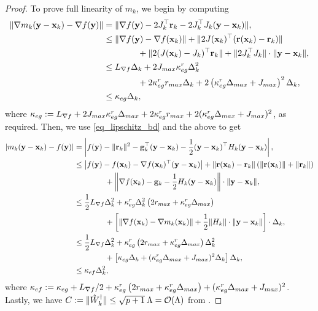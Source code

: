\begin{proof}
To prove full linearity of $m_k$, we begin by computing
\begin{align}
	\|\nabla m_k(\mathbf{y}-\mathbf{x}_k) - \nabla f(\mathbf{y})\| &= \|\nabla f(\mathbf{y}) - 2 J_k^{\top}\mathbf{r}_k - 2 J_k^{\top}J_k(\mathbf{y}-\mathbf{x}_k)\|, \\
	&\leq \|\nabla f(\mathbf{y}) - \nabla f(\mathbf{x}_k)\| + \|2J(\mathbf{x}_k)^{\top}(\mathbf{r}(\mathbf{x}_k)-\mathbf{r}_k)\| \nonumber \\ 
	&\qquad\qquad + \|2(J(\mathbf{x}_k)-J_k)^{\top}\mathbf{r}_k\| + \|2 J_k^{\top}J_k\|\cdot\|\mathbf{y}-\mathbf{x}_k\|, \\
	&\leq L_{\nabla f} \Delta_k + 2J_{max}\kappa_{eg}^r\Delta_k^2 \nonumber \\
	&\qquad\qquad + 2\kappa_{eg}^r r_{max}\Delta_k + 2\left(\kappa_{eg}^r\Delta_{max}+J_{max}\right)^2\Delta_k, \\
	&\leq \kappa_{eg}\Delta_k,
\end{align}
where $\kappa_{eg}:= L_{\nabla f} + 2 J_{max}\kappa_{eg}^r \Delta_{max} + 2\kappa_{eg}^r r_{max} + 2(\kappa_{eg}^r\Delta_{max}+J_{max})^2$, as required.
Then, we use \eqref{eq_lipschitz_bd} and the above to get
\begin{align}
	|m_k(\mathbf{y}-\mathbf{x}_k) - f(\mathbf{y})| &= \left|f(\mathbf{y}) - \|\mathbf{r}_k\|^2 - \mathbf{g}_k^{\top}(\mathbf{y}-\mathbf{x}_k) - \frac{1}{2}(\mathbf{y}-\mathbf{x}_k)^{\top}H_k(\mathbf{y}-\mathbf{x}_k)\right|, \\
	&\leq \left|f(\mathbf{y}) - f(\mathbf{x}_k) - \nabla f(\mathbf{x}_k)^{\top}(\mathbf{y}-\mathbf{x}_k)\right| + \|\mathbf{r}(\mathbf{x}_k)-\mathbf{r}_k\|\left(\|\mathbf{r}(\mathbf{x}_k)\|+\|\mathbf{r}_k\|\right) \nonumber \\ 
	&\qquad\qquad + \left\|\nabla f(\mathbf{x}_k) - \mathbf{g}_k - \frac{1}{2}H_k(\mathbf{y}-\mathbf{x}_k)\right\|\cdot\|\mathbf{y}-\mathbf{x}_k\|, \\
	&\leq \frac{1}{2}L_{\nabla f} \Delta_k^2 + \kappa_{eg}^r \Delta_k^2 \left(2r_{max}+\kappa_{eg}^r\Delta_{max}\right) \nonumber \\
	&\qquad\qquad + \left[\|\nabla f(\mathbf{x}_k) - \nabla m_k(\mathbf{x}_k)\| + \frac{1}{2}\|H_k\|\cdot\|\mathbf{y}-\mathbf{x}_k\|\right]\cdot \Delta_k, \\
	&\leq \frac{1}{2}L_{\nabla f} \Delta_k^2 + \kappa_{eg}^r \left(2r_{max}+\kappa_{eg}^r\Delta_{max}\right) \Delta_k^2 \nonumber \\
	&\qquad\qquad + \left[\kappa_{eg}\Delta_k + (\kappa_{eg}^r\Delta_{max}+J_{max})^2\Delta_k\right]\Delta_k, \\
	&\leq \kappa_{ef}\Delta_k^2,
\end{align}
where $\kappa_{ef} := \kappa_{eg} + L_{\nabla f}/2 + \kappa_{eg}^r \left(2r_{max}+\kappa_{eg}^r\Delta_{max}\right) + (\kappa_{eg}^r\Delta_{max} + J_{max})^2$.
Lastly, we have $C:=\|\hat{W}_k^{\dagger}\|\leq\sqrt{p+1}\:\Lambda=\mathcal{O}(\Lambda)$ from \cite[Theorem 2.9]{Conn2008}.%
\end{proof}

